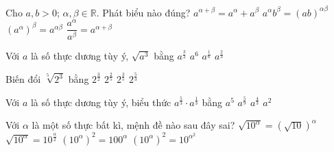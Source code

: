 \begin{ex}%
	Cho $ a,b>0$;  $\alpha,\beta \in \mathbb{R}$. Phát biểu nào đúng?
	\choice 
		{$a^{\alpha  +\beta}=a^{\alpha}+a^{\beta}$}
		{$a^{\alpha}b^{\beta}=(ab)^{\alpha  \beta}$}
		{\True $\left(a^{\alpha}\right)^{\beta}=a^{\alpha \beta}$} 
		{$\dfrac{a^{\alpha}}{a^{\beta}}=a^{\alpha  +\beta}$}
\end{ex}

\begin{ex}%
	Với $a$ là  số thực dương tùy ý, $\sqrt{a^3}$ bằng
	 \choice
		{\True  $a^{\tfrac{3}{2}}$}
		 {$a^6$}
		 {$a^{\tfrac{1}{6}}$}
		{$a^{\tfrac{2}{3}}$} 
\end{ex}

\begin{ex}%
	Biến đổi $\sqrt[5]{2^3}$ bằng 
	\choice 
		{$2^{\tfrac{3}{2}}$} 
		 {$2^{\tfrac{2}{5}}$}
		{\True  $2^{\tfrac{3}{5}}$}
		{$2^{\tfrac{5}{3}}$} 
\end{ex}

\begin{ex}%
	Với $a$ là số thực dương tùy  ý, biểu thức $a^{\tfrac{5}{3}}\cdot a^{\tfrac{1}{3}}$ bằng
	\choice 
		{$a^{5}$} 
		{$a^{\tfrac{5}{9}}$} 
		 {$a^{\tfrac{4}{3}}$}
		{\True $a^2$} 
\end{ex}

\begin{ex}%
	Với  $\alpha$ là một số thực bất kì, mệnh đề nào sau đây sai?
	\choice 
		{$\sqrt{10^\alpha} = \left(\sqrt{10  }\right)^\alpha$}
		{$\sqrt{10^\alpha} =  10^{\tfrac{\alpha}{2}}$}
		{$\left(10^\alpha \right)^2 =  100^\alpha$}
		{\True $\left(10^\alpha  \right)^2 = 10^{\alpha^2}$}
\end{ex}

